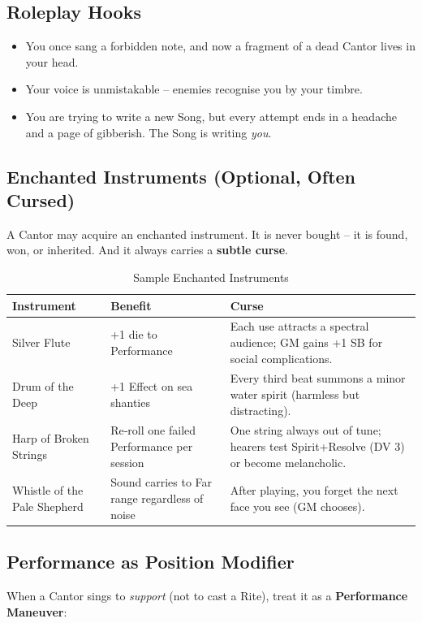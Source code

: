 \documentclass[10pt,a5paper]{book}
\begin{document}
\subsection{Roleplay Hooks}
\begin{itemize}
    \item You once sang a forbidden note, and now a fragment of a dead Cantor lives in your head.
    \item Your voice is unmistakable – enemies recognise you by your timbre.
    \item You are trying to write a new Song, but every attempt ends in a headache and a page of gibberish. The Song is writing \textit{you}.
\end{itemize}

\subsection{Enchanted Instruments (Optional, Often Cursed)}
A Cantor may acquire an enchanted instrument. It is never bought – it is found, won, or inherited. And it always carries a \textbf{subtle curse}.

\begin{center}
\begin{longtable}{p{2.5cm} p{3.5cm} p{5cm}}
\caption{Sample Enchanted Instruments}\\
\toprule
Instrument & Benefit & Curse \\
\midrule
Silver Flute & +1 die to Performance & Each use attracts a spectral audience; GM gains +1 SB for social complications. \\
Drum of the Deep & +1 Effect on sea shanties & Every third beat summons a minor water spirit (harmless but distracting). \\
Harp of Broken Strings & Re‑roll one failed Performance per session & One string always out of tune; hearers test Spirit+Resolve (DV 3) or become melancholic. \\
Whistle of the Pale Shepherd & Sound carries to Far range regardless of noise & After playing, you forget the next face you see (GM chooses). \\
\bottomrule
\end{longtable}
\end{center}

\subsection{Performance as Position Modifier}
When a Cantor sings to \textit{support} (not to cast a Rite), treat it as a \textbf{Performance Maneuver}:
\end{document}
